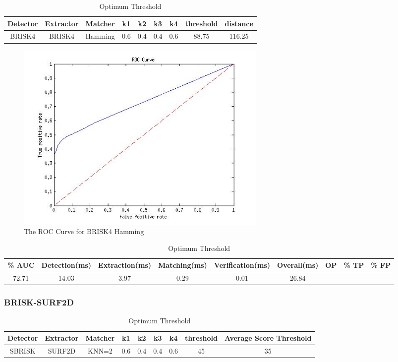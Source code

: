 \documentclass{article}
\begin{document}
\begin{table}
\caption{Optimum Threshold}
\begin{tabular}{|c|c|c|c|c|c|c|c|c|}
\hline 
Detector & Extractor & Matcher & k1 & k2 & k3 & k4 & threshold & distance\tabularnewline
\hline 
\hline 
BRISK4 & BRISK4 & Hamming & 0.6 & 0.4 & 0.4 & 0.6 & 88.75 & 116.25\tabularnewline
\hline 
\end{tabular}
\label{tab:sbrisk}
\end{table}

\begin{figure}[h!]
	\centering
		\includegraphics[width=0.6\textwidth]{../Drawings/ROC_BRISK4_BRISK4_Hamming.jpg}
	\caption{The ROC Curve for BRISK4 Hamming}
	\label{fig:sbriskroc}
\end{figure}

\begin{table}
\caption{Optimum Threshold}
\begin{tabular}{|c|c|c|c|c|c|c|c|c|}
\hline 
\% AUC & Detection(ms) & Extraction(ms) & Matching(ms) & Verification(ms) & Overall(ms) & OP & \% TP & \% FP\tabularnewline
\hline 
\hline 
72.71 & 14.03 & 3.97 & 0.29 & 0.01 & 26.84 &  &  & \tabularnewline
\hline 
\end{tabular}
\label{tab:sbrisk}
\end{table}


\subsubsection{BRISK-SURF2D}
\label{sec:brisk2dsurfResults}

\begin{table}
\caption{Optimum Threshold}
\begin{tabular}{|c|c|c|c|c|c|c|c|c|}
\hline 
Detector & Extractor & Matcher & k1 & k2 & k3 & k4 & threshold & Average Score Threshold\tabularnewline
\hline 
\hline 
SBRISK & SURF2D & KNN=2 & 0.6 & 0.4 & 0.4 & 0.6 & 45 & 35\tabularnewline
\hline 
\end{tabular}

\label{tab:sbrisk}
\end{table}
\end{document}
